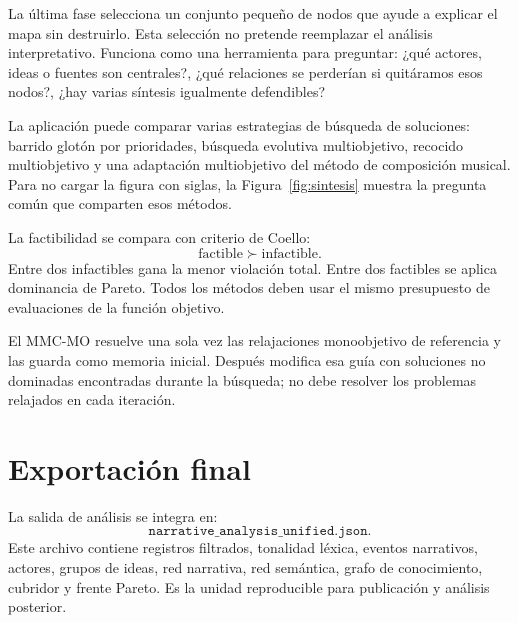 \documentclass[11pt]{article}
\begin{document}
La última fase selecciona un conjunto pequeño de nodos que ayude a explicar el
mapa sin destruirlo. Esta selección no pretende reemplazar el análisis
interpretativo. Funciona como una herramienta para preguntar: ¿qué actores,
ideas o fuentes son centrales?, ¿qué relaciones se perderían si quitáramos esos
nodos?, ¿hay varias síntesis igualmente defendibles?

La aplicación puede comparar varias estrategias de búsqueda de soluciones:
barrido glotón por prioridades, búsqueda evolutiva multiobjetivo, recocido
multiobjetivo y una adaptación multiobjetivo del método de composición musical.
Para no cargar la figura con siglas, la Figura~\ref{fig:sintesis} muestra la
pregunta común que comparten esos métodos.

La factibilidad se compara con criterio de Coello:
\[
\text{factible} \succ \text{infactible}.
\]
Entre dos infactibles gana la menor violación total. Entre dos factibles se
aplica dominancia de Pareto. Todos los métodos deben usar el mismo presupuesto
de evaluaciones de la función objetivo.

El MMC-MO resuelve una sola vez las relajaciones monoobjetivo de referencia y
las guarda como memoria inicial. Después modifica esa guía con soluciones no
dominadas encontradas durante la búsqueda; no debe resolver los problemas
relajados en cada iteración.

\section{Exportación final}

La salida de análisis se integra en:
\[
\texttt{narrative\_analysis\_unified.json}.
\]
Este archivo contiene registros filtrados, tonalidad léxica, eventos narrativos,
actores, grupos de ideas, red narrativa, red semántica, grafo de conocimiento,
cubridor y frente Pareto. Es la unidad reproducible para publicación y análisis
posterior.


\end{document}
